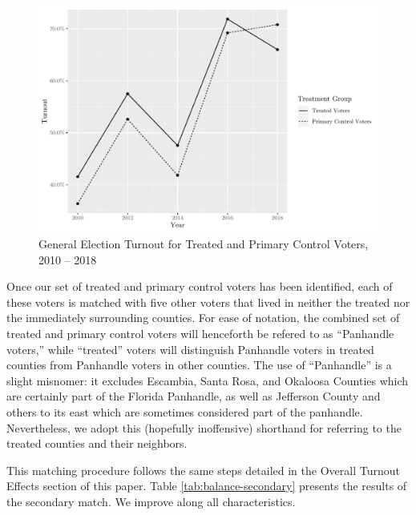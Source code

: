 \documentclass[
  12pt,
]{article}
\begin{document}
\begin{figure}[H]

{\centering \includegraphics{hurricane_michael_files/figure-latex/ll-to-chunk-1} 

}

\caption{\label{fig:ll-to}General Election Turnout for Treated and Primary Control Voters, 2010 -- 2018}\label{fig:ll-to-chunk}
\end{figure}

Once our set of treated and primary control voters has been identified, each of these voters is matched with five other voters that lived in neither the treated nor the immediately surrounding counties. For ease of notation, the combined set of treated and primary control voters will henceforth be refered to as ``Panhandle voters,'' while ``treated'' voters will distinguish Panhandle voters in treated counties from Panhandle voters in other counties. The use of ``Panhandle'' is a slight misnomer: it excludes Escambia, Santa Rosa, and Okaloosa Counties which are certainly part of the Florida Panhandle, as well as Jefferson County and others to its east which are sometimes considered part of the panhandle. Nevertheless, we adopt this (hopefully inoffensive) shorthand for referring to the treated counties and their neighbors.

This matching procedure follows the same steps detailed in the Overall Turnout Effects section of this paper. Table \ref{tab:balance-secondary} presents the results of the secondary match. We improve along all characteristics.
\end{document}
